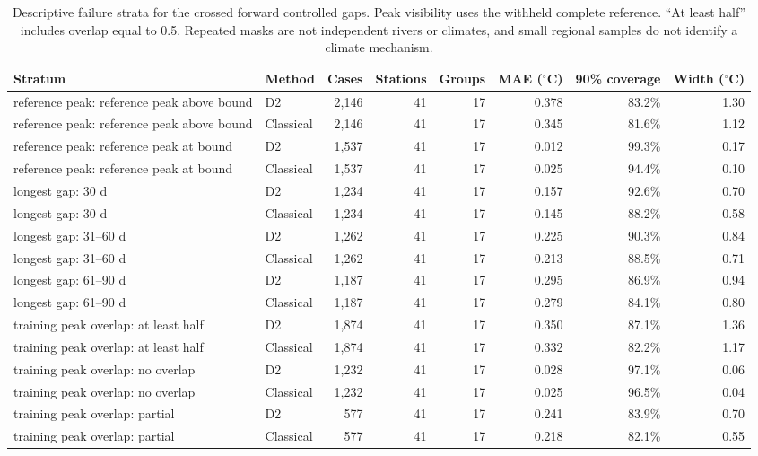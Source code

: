 \begin{table}[p]
\centering
\scriptsize
\setlength{\tabcolsep}{3pt}
\renewcommand{\arraystretch}{0.96}
\caption{Descriptive failure strata for the crossed forward controlled gaps. Peak visibility uses the withheld complete reference. ``At least half'' includes overlap equal to 0.5. Repeated masks are not independent rivers or climates, and small regional samples do not identify a climate mechanism.}
\label{tab:failure-strata}
\begin{tabular}{@{}llrrrrrr@{}}
\toprule
Stratum & Method & Cases & Stations & Groups & MAE ($^{\circ}$C) & 90\% coverage & Width ($^{\circ}$C) \\
\midrule
reference peak: reference peak above bound & D2 & 2,146 & 41 & 17 & 0.378 & 83.2\% & 1.30 \\
reference peak: reference peak above bound & Classical & 2,146 & 41 & 17 & 0.345 & 81.6\% & 1.12 \\
reference peak: reference peak at bound & D2 & 1,537 & 41 & 17 & 0.012 & 99.3\% & 0.17 \\
reference peak: reference peak at bound & Classical & 1,537 & 41 & 17 & 0.025 & 94.4\% & 0.10 \\
longest gap: 30 d & D2 & 1,234 & 41 & 17 & 0.157 & 92.6\% & 0.70 \\
longest gap: 30 d & Classical & 1,234 & 41 & 17 & 0.145 & 88.2\% & 0.58 \\
longest gap: 31--60 d & D2 & 1,262 & 41 & 17 & 0.225 & 90.3\% & 0.84 \\
longest gap: 31--60 d & Classical & 1,262 & 41 & 17 & 0.213 & 88.5\% & 0.71 \\
longest gap: 61--90 d & D2 & 1,187 & 41 & 17 & 0.295 & 86.9\% & 0.94 \\
longest gap: 61--90 d & Classical & 1,187 & 41 & 17 & 0.279 & 84.1\% & 0.80 \\
training peak overlap: at least half & D2 & 1,874 & 41 & 17 & 0.350 & 87.1\% & 1.36 \\
training peak overlap: at least half & Classical & 1,874 & 41 & 17 & 0.332 & 82.2\% & 1.17 \\
training peak overlap: no overlap & D2 & 1,232 & 41 & 17 & 0.028 & 97.1\% & 0.06 \\
training peak overlap: no overlap & Classical & 1,232 & 41 & 17 & 0.025 & 96.5\% & 0.04 \\
training peak overlap: partial & D2 & 577 & 41 & 17 & 0.241 & 83.9\% & 0.70 \\
training peak overlap: partial & Classical & 577 & 41 & 17 & 0.218 & 82.1\% & 0.55 \\
\bottomrule
\end{tabular}
\end{table}

